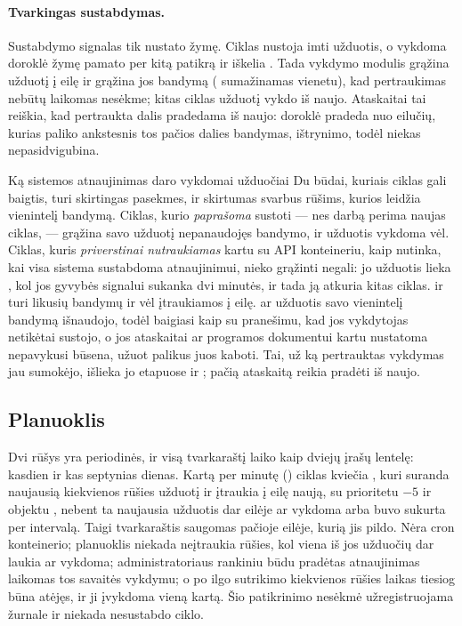 \paragraph{Tvarkingas sustabdymas.} Sustabdymo signalas tik nustato žymę. Ciklas nustoja imti
užduotis, o vykdoma doroklė žymę pamato per kitą patikrą ir iškelia .
Tada vykdymo modulis grąžina užduotį į eilę ir grąžina jos bandymą (
sumažinamas vienetu), kad pertraukimas nebūtų laikomas nesėkme; kitas ciklas užduotį vykdo
iš naujo. Ataskaitai tai reiškia, kad pertraukta dalis pradedama iš naujo: doroklė pradeda
nuo eilučių, kurias paliko ankstesnis tos pačios dalies bandymas, ištrynimo, todėl niekas
nepasidvigubina.

\begin{notebox}{Ką sistemos atnaujinimas daro vykdomai užduočiai}
Du būdai, kuriais ciklas gali baigtis, turi skirtingas pasekmes, ir skirtumas svarbus
rūšims, kurios leidžia vienintelį bandymą. Ciklas, kurio \emph{paprašoma} sustoti --- nes
darbą perima naujas ciklas, --- grąžina savo užduotį nepanaudojęs bandymo, ir užduotis
vykdoma vėl. Ciklas, kuris \emph{priverstinai nutraukiamas} kartu su API konteineriu, kaip nutinka, kai visa
sistema sustabdoma atnaujinimui, nieko grąžinti negali: jo užduotis lieka , kol
jos gyvybės signalui sukanka dvi minutės, ir tada ją atkuria kitas ciklas.
 ir  turi likusių bandymų ir vėl įtraukiamos į
eilę.  ar  užduotis savo vienintelį bandymą
išnaudojo, todėl baigiasi kaip  su pranešimu, kad jos vykdytojas netikėtai
sustojo, o jos ataskaitai ar programos dokumentui kartu nustatoma nepavykusi būsena, užuot
palikus juos kaboti. Tai, už ką pertrauktas vykdymas jau sumokėjo, išlieka jo etapuose ir
; pačią ataskaitą reikia pradėti iš naujo.
\end{notebox}

\subsection{Planuoklis}

Dvi rūšys yra periodinės, ir  visą tvarkaraštį laiko kaip dviejų
įrašų lentelę:  kasdien ir  kas septynias
dienas. Kartą per minutę () ciklas kviečia , kuri suranda
naujausią kiekvienos rūšies užduotį ir įtraukia į eilę naują, su prioritetu $-5$ ir objektu
, nebent ta naujausia užduotis dar eilėje ar vykdoma arba buvo sukurta
per intervalą. Taigi tvarkaraštis saugomas pačioje eilėje, kurią jis pildo. Nėra cron
konteinerio; planuoklis niekada neįtraukia rūšies, kol viena iš jos užduočių dar laukia ar
vykdoma; administratoriaus rankiniu būdu pradėtas atnaujinimas laikomas tos savaitės vykdymu;
o po ilgo sutrikimo kiekvienos rūšies laikas tiesiog būna atėjęs, ir ji įvykdoma vieną kartą.
Šio patikrinimo nesėkmė užregistruojama žurnale ir niekada nesustabdo ciklo.

